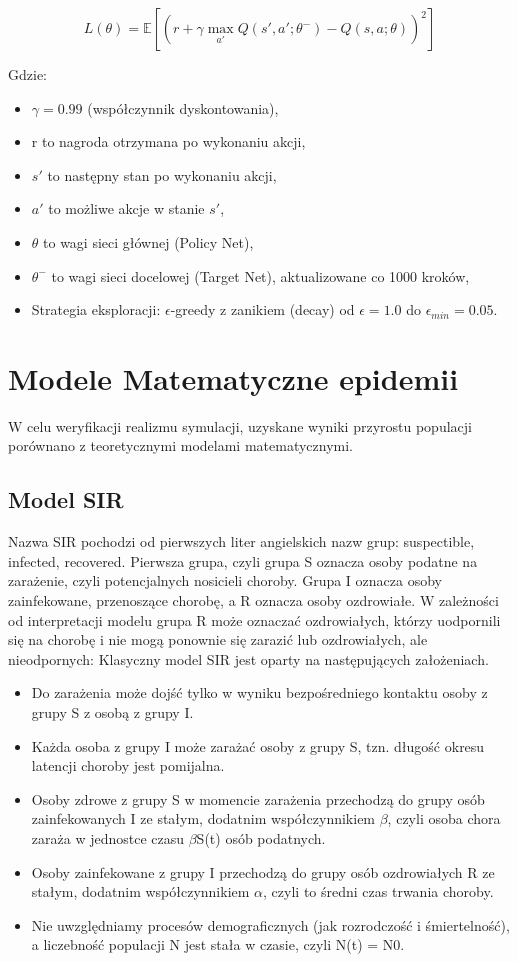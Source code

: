 \documentclass[12pt, a4paper]{article}
\begin{document}
$$ L(\theta) = \mathbb{E} \left[ \left( r + \gamma \max_{a'} Q(s', a'; \theta^{-}) - Q(s, a; \theta) \right)^2 \right] $$

Gdzie:
\begin{itemize}
    \item $\gamma = 0.99$ (współczynnik dyskontowania),
    \item r to nagroda otrzymana po wykonaniu akcji,
    \item $s'$ to następny stan po wykonaniu akcji,
    \item $a'$ to możliwe akcje w stanie $s'$,
    \item $\theta$ to wagi sieci głównej (Policy Net),
    \item $\theta^{-}$ to wagi sieci docelowej (Target Net), aktualizowane co 1000 kroków,
    \item Strategia eksploracji: $\epsilon$-greedy z zanikiem (decay) od $\epsilon=1.0$
          do $\epsilon_{min}=0.05$.
\end{itemize}

\section{Modele Matematyczne epidemii}
W celu weryfikacji realizmu symulacji, uzyskane wyniki przyrostu populacji
porównano z teoretycznymi modelami matematycznymi.

\subsection{Model SIR}
Nazwa SIR pochodzi od pierwszych liter angielskich nazw grup: suspectible,
infected, recovered. Pierwsza grupa, czyli grupa S oznacza osoby podatne na
zarażenie, czyli potencjalnych nosicieli choroby. Grupa I oznacza osoby
zainfekowane, przenoszące chorobę, a R oznacza osoby ozdrowiałe. W zależności
od interpretacji modelu grupa R może oznaczać ozdrowiałych, którzy uodpornili
się na chorobę i nie mogą ponownie się zarazić lub ozdrowiałych, ale
nieodpornych: Klasyczny model SIR jest oparty na następujących założeniach.
\begin{itemize}
    \item Do zarażenia może dojść tylko w wyniku bezpośredniego kontaktu osoby z grupy S
          z osobą z grupy I.
    \item Każda osoba z grupy I może zarażać osoby z grupy S, tzn. długość okresu
          latencji choroby jest pomijalna.
    \item Osoby zdrowe z grupy S w momencie zarażenia przechodzą do grupy osób
          zainfekowanych I ze stałym, dodatnim współczynnikiem $\beta$, czyli osoba chora
          zaraża w jednostce czasu $\beta$S(t) osób podatnych.
    \item Osoby zainfekowane z grupy I przechodzą do grupy osób ozdrowiałych R ze stałym,
          dodatnim współczynnikiem $\alpha$, czyli to średni czas trwania choroby.
    \item Nie uwzględniamy procesów demograficznych (jak rozrodczość i śmiertelność), a
          liczebność populacji N jest stała w czasie, czyli N(t) = N0.
\end{itemize}
\end{document}

